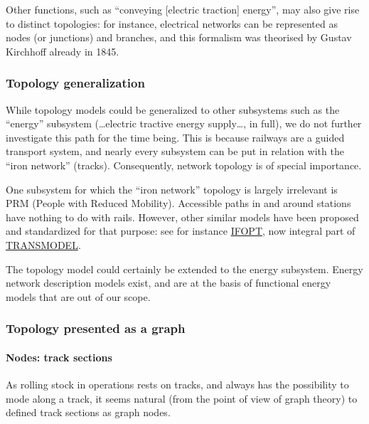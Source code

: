 \documentclass[
  11pt,
]{article}
\begin{document}
Other functions, such as ``conveying {[}electric traction{]} energy'',
may also give rise to distinct topologies: for instance, electrical
networks can be represented as nodes (or junctions) and branches, and
this formalism was theorised by Gustav Kirchhoff already in 1845.

\hypertarget{topology-generalization}{%
\subsubsection{Topology generalization}\label{topology-generalization}}

While topology models could be generalized to other subsystems such as
the ``energy'' subsystem (\ldots electric tractive energy supply\ldots,
in full), we do not further investigate this path for the time being.
This is because railways are a guided transport system, and nearly every
subsystem can be put in relation with the ``iron network'' (tracks).
Consequently, network topology is of special importance.

One subsystem for which the ``iron network'' topology is largely
irrelevant is PRM (People with Reduced Mobility). Accessible paths in
and around stations have nothing to do with rails. However, other
similar models have been proposed and standardized for that purpose: see
for instance
\href{https://en.wikipedia.org/wiki/Identification_of_Fixed_Objects_in_Public_Transport}{IFOPT},
now integral part of \href{https://www.transmodel-cen.eu/}{TRANSMODEL}.

The topology model could certainly be extended to the energy subsystem.
Energy network description models exist, and are at the basis of
functional energy models that are out of our scope.

\hypertarget{topology-presented-as-a-graph}{%
\subsubsection{Topology presented as a
graph}\label{topology-presented-as-a-graph}}

\hypertarget{nodes-track-sections}{%
\paragraph{Nodes: track sections}\label{nodes-track-sections}}

As rolling stock in operations rests on tracks, and always has the
possibility to mode along a track, it seems natural (from the point of
view of graph theory) to defined track sections as graph nodes.
\end{document}
